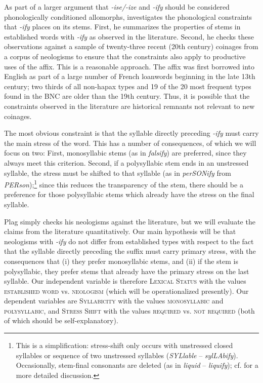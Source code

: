 As part of a larger argument that \textit{-ise/-ize} and \textit{-ify} should be considered phonologically conditioned allomorphs, \citet{plag_morphological_1999} investigates the phonological constraints that \textit{-ify} places on its stems.  First, he summarizes the properties of stems in established words with \textit{-ify} as observed in the literature. Second, he checks these observations against a sample of twenty\hyp{}three recent (20th century) coinages from a corpus of neologisms  to ensure that the constraints also apply to productive  uses of the affix.  This is a reasonable approach. The affix  was first borrowed into English as part of a large number of French loanwords beginning in the late 13th century; two thirds of all non\hyp{}hapax  types  and 19 of the 20 most frequent types found in the BNC  are older than the 19th century. Thus, it is possible that the constraints observed in the literature are historical remnants not relevant to new coinages.

The most obvious constraint is that the syllable  directly preceding \textit{-ify} must carry the main stress of the word. This has a number of consequences, of which we will focus on two: First, monosyllabic stems  (as in \textit{falsify}) are preferred, since they always meet this criterion. Second, if a polysyllabic stem ends in an unstressed syllable, the stress must be shifted to that syllable (as in \textit{perSONify} from \textit{PERson});\footnote{This is a simplification: stress\hyp{}shift only occurs with unstressed closed syllables or sequence of two unstressed syllables  (\textit{SYLlable} -- \textit{sylLAbify}). Occasionally, stem\hyp{}final  consonants  are deleted (as in \textit{liquid} -- \textit{liquify}); cf. \citet{plag_morphological_1999} for a more detailed discussion.} since this reduces the transparency of the stem, there should be a preference for those polysyllabic stems  which already have the stress on the final  syllable.

Plag simply checks his neologisms  against the literature, but we will evaluate the claims from the literature quantitatively.  Our main hypothesis will be that neologisms with \textit{-ify} do not differ from established types  with respect to the fact that the syllable  directly preceding the suffix  must carry primary stress, with the consequences that (i) they prefer monosyllabic stems,  and (ii) if the stem  is polysyllabic, they prefer stems that already have the primary stress on the last syllable. Our independent variable is therefore \textsc{Lexical Status} with the values \textsc{established word} vs. \textsc{neologism}  (which will be operationalized  presently). Our dependent variables are \textsc{Syllabicity}  with the values \textsc{monosyllabic} and \textsc{polysyllabic}, and \textsc{Stress Shift} with the values \textsc{required} vs. \textsc{not required} (both of which should be self\hyp{}explanatory).

